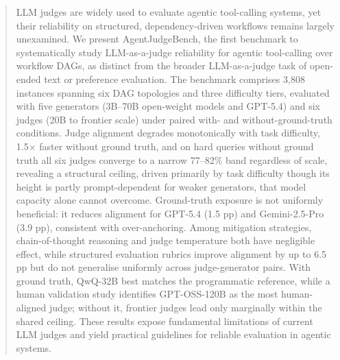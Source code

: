 \begin{abstract}
LLM judges are widely used to evaluate agentic tool-calling systems, yet their reliability on structured, dependency-driven workflows remains largely unexamined. We present AgentJudgeBench, the first benchmark to systematically study LLM-as-a-judge reliability for agentic tool-calling over workflow DAGs, as distinct from the broader LLM-as-a-judge task of open-ended text or preference evaluation. The benchmark comprises 3,808 instances spanning six DAG topologies and three difficulty tiers, evaluated with five generators (3B--70B open-weight models and GPT-5.4) and six judges (20B to frontier scale) under paired with- and without-ground-truth conditions. Judge alignment degrades monotonically with task difficulty, 1.5$\times$ faster without ground truth, and on hard queries without ground truth all six judges converge to a narrow 77--82\% band regardless of scale, revealing a structural ceiling, driven primarily by task difficulty though its height is partly prompt-dependent for weaker generators, that model capacity alone cannot overcome. Ground-truth exposure is not uniformly beneficial: it reduces alignment for GPT-5.4 (1.5 pp) and Gemini-2.5-Pro (3.9 pp), consistent with over-anchoring. Among mitigation strategies, chain-of-thought reasoning and judge temperature both have negligible effect, while structured evaluation rubrics improve alignment by up to 6.5 pp but do not generalise uniformly across judge-generator pairs. With ground truth, QwQ-32B best matches the programmatic reference, while a human validation study identifies GPT-OSS-120B as the most human-aligned judge; without it, frontier judges lead only marginally within the shared ceiling. These results expose fundamental limitations of current LLM judges and yield practical guidelines for reliable evaluation in agentic systems.
\end{abstract}